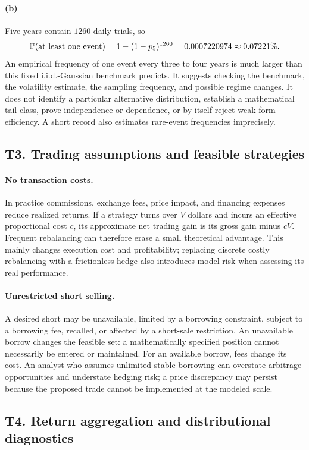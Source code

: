 \paragraph{(b)} Five years contain $1260$ daily trials, so
\[
 \mathbb P(\hbox{at least one event})=1-(1-p_5)^{1260}
 =0.0007220974\approx0.07221\%.
\]
An empirical frequency of one event every three to four years is much larger than this fixed i.i.d.-Gaussian benchmark predicts. It suggests checking the benchmark, the volatility estimate, the sampling frequency, and possible regime changes. It does not identify a particular alternative distribution, establish a mathematical tail class, prove independence or dependence, or by itself reject weak-form efficiency. A short record also estimates rare-event frequencies imprecisely.

\subsection{T3. Trading assumptions and feasible strategies}
\paragraph{No transaction costs.} In practice commissions, exchange fees, price impact, and financing expenses reduce realized returns. If a strategy turns over $V$ dollars and incurs an effective proportional cost $c$, its approximate net trading gain is its gross gain minus $cV$. Frequent rebalancing can therefore erase a small theoretical advantage. This mainly changes execution cost and profitability; replacing discrete costly rebalancing with a frictionless hedge also introduces model risk when assessing its real performance.
\paragraph{Unrestricted short selling.} A desired short may be unavailable, limited by a borrowing constraint, subject to a borrowing fee, recalled, or affected by a short-sale restriction. An unavailable borrow changes the feasible set: a mathematically specified position cannot necessarily be entered or maintained. For an available borrow, fees change its cost. An analyst who assumes unlimited stable borrowing can overstate arbitrage opportunities and understate hedging risk; a price discrepancy may persist because the proposed trade cannot be implemented at the modeled scale.

\subsection{T4. Return aggregation and distributional diagnostics}
